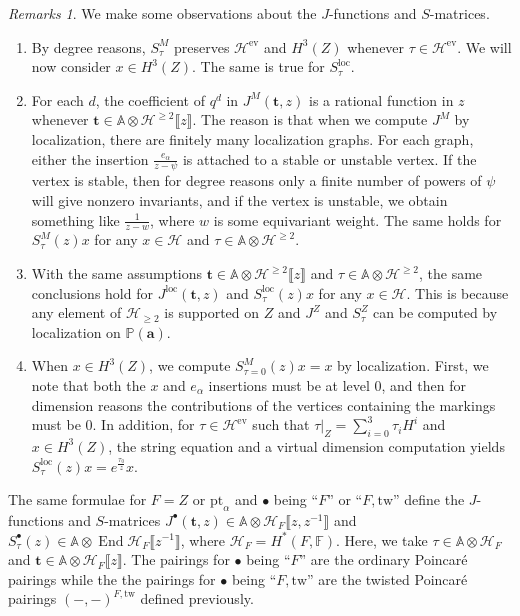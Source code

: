 \documentclass[10pt]{amsart}
\theoremstyle{definition}
\theoremstyle{remark}
\newtheorem{rmks}[thm]{Remarks}
\theoremstyle{plain}
\theoremstyle{definition}
\theoremstyle{remark}
\newcommand{\A}{\mathbb{A}}
\newcommand{\F}{\mathbb{F}}
\newcommand{\ba}{\mathbf{a}}
\renewcommand{\P}{\mathbb{P}}
\newcommand{\msc}[1]{\mathscr{#1}}
\newcommand{\mbf}[1]{\mathbf{#1}}
\newcommand{\mr}[1]{\mathrm{#1}}
\newcommand{\1}{\mathbf{1}}
\newcommand{\2}{\mathbf{2}}
\newcommand{\3}{\mathbf{3}}
\newcommand{\pt}{\mr{pt}}
\newcommand{\loc}{\mr{loc}}
\newcommand{\tw}{\mr{tw}}
\newcommand{\ps}[1]{\llbracket #1 \rrbracket}
\DeclareMathOperator{\End}{End}
\DeclareMathOperator{\ev}{ev}
\numberwithin{equation}{section}
\begin{document}
\begin{rmks}
    We make some observations about the $J$-functions and $S$-matrices.
    \begin{enumerate}
        \item By degree reasons, $S_{\tau}^M$ preserves $\msc{H}^{\ev}$ and $H^3(Z)$ whenever $\tau \in \msc{H}^{\ev}$. We will now consider $x \in H^3(Z)$. The same is true for $S^{\loc}_{\tau}$. 
        \item For each $d$, the coefficient of $q^d$ in $J^{M}(\mbf{t}, z)$ is a rational function in $z$ whenever $\mbf{t} \in \A \otimes \msc{H}^{\geq 2}\ps{z}$. The reason is that when we compute $J^M$ by localization, there are finitely many localization graphs. For each graph, either the insertion $\frac{e_{\alpha}}{z-\psi}$ is attached to a stable or unstable vertex. If the vertex is stable, then for degree reasons only a finite number of powers of $\psi$ will give nonzero invariants, and if the vertex is unstable, we obtain something like $\frac{1}{z-w}$, where $w$ is some equivariant weight. The same holds for $S_{\tau}^{M}(z) x$ for any $x \in \msc{H}$ and $ \tau \in \A \otimes \msc{H}^{\geq 2}$.
        \item With the same assumptions $\mbf{t} \in \A \otimes \msc{H}^{\geq 2} \ps{z}$ and $\tau \in \A \otimes \msc{H}^{\geq 2}$, the same conclusions hold for $J^{\loc}(\mbf{t}, z)$ and $S_{\tau}^{\loc}(z)x$ for any $x \in \msc{H}$. This is because any element of $\msc{H}_{\geq 2}$ is supported on $Z$ and $J^Z$ and $S^Z_{\tau}$ can be computed by localization on $\P(\ba)$.
        \item When $x \in H^3(Z)$, we compute $S_{\tau=0}^M(z)x = x$ by localization. First, we note that both the $x$ and $e_{\alpha}$ insertions must be at level $0$, and then for dimension reasons the contributions of the vertices containing the markings must be $0$. In addition, for $\tau \in \msc{H}^{\ev}$ such that $\tau|_Z = \sum_{i=0}^3 \tau_i H^i$ and $x \in H^3(Z)$, the string equation and a virtual dimension computation yields $S_{\tau}^{\loc}(z)x = e^{\frac{\tau_0}{z}} x$.
    \end{enumerate}
\end{rmks}


The same formulae for $F = Z$ or $\pt_{\alpha}$ and $\bullet$ being ``$F$'' or ``$F, \tw$'' define the $J$-functions and $S$-matrices $J^{\bullet}(\mbf{t}, z) \in \A \otimes \msc{H}_F\ps{z,z^{-1}}$ and $S_{\tau}^{\bullet}(z) \in \A \otimes \End \msc{H}_F\ps{z^{-1}}$, where $\msc{H}_F = H^*(F, \F)$. Here, we take $\tau \in \A \otimes \msc{H}_F$ and $\mbf{t} \in \A \otimes \msc{H}_F\ps{z}$. The pairings for $\bullet$ being ``$F$'' are the ordinary Poincar\'e pairings while the the pairings for $\bullet$ being ``$F,\tw$'' are the twisted Poincar\'e pairings $(-,-)^{F, \tw}$ defined previously.
\end{document}
